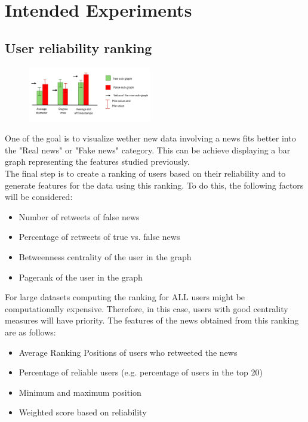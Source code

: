 \documentclass[11pt,a4paper]{article}
\begin{document}
\section*{Intended Experiments}

\subsection*{User reliability ranking}
\begin{figure}
	\begin{center}
	  \includegraphics[width=0.48\textwidth]{results}
	\end{center}
\end{figure}
One of the goal is to visualize wether new data involving a news fits better into the "Real news" or "Fake news" category. This can be achieve displaying a bar graph representing the features studied previously.\\
The final step is to create a ranking of users based on their reliability and to generate features for the data using this ranking. To do this, the following factors will be considered:
\begin{itemize}
	\setlength\itemsep{-0.3em}
	\item Number of retweets of false news
	\item Percentage of retweets of true vs. false news
	\item Betweenness centrality of the user in the graph
	\item Pagerank of the user in the graph
\end{itemize}

For large datasets computing the ranking for ALL users might be computationally expensive. Therefore, in this case, users with good centrality measures will have priority. 
The features of the news obtained from this ranking are as follows:
\begin{itemize}
	\setlength\itemsep{-0.3em}
	\item Average Ranking Positions of users who retweeted the news
	\item Percentage of reliable users (e.g. percentage of users in the top 20)
	\item Minimum and maximum position
	\item Weighted score based on reliability
\end{itemize}
\end{document}
